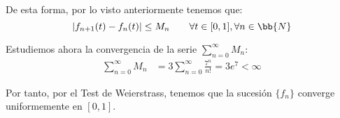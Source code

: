 \documentclass[12pt]{article}
\begin{document}
\begin{ejercicio}
        De esta forma, por lo visto anteriormente tenemos que:
        \begin{equation*}
            |f_{n+1}(t)-f_n(t)|\leq M_n\qquad \forall t\in [0,1],\forall n\in\bb{N}
        \end{equation*}

        Estudiemos ahora la convergencia de la serie $\sum\limits_{n=0}^{\infty}M_n$:
        \begin{align*}
            \sum_{n=0}^{\infty}M_n
            &=3\sum_{n=0}^{\infty}\frac{7^n}{n!}
            =3e^7<\infty
        \end{align*}

        Por tanto, por el Test de Weierstrass, tenemos que la sucesión $\{f_n\}$ converge uniformemente en $[0,1]$.
    \end{ejercicio}
\end{document}

